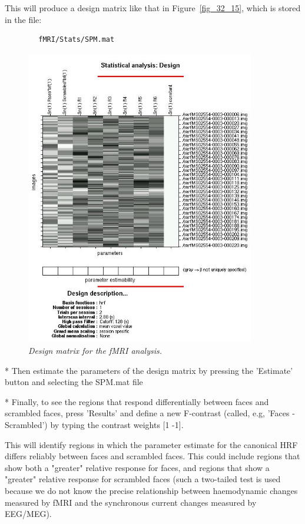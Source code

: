 This will produce a design matrix like that in Figure~\ref{fig_32_15}, which is stored in the file:
\begin{verbatim}
		fMRI/Stats/SPM.mat
\end{verbatim}

\begin{figure}
\begin{center}
\includegraphics[width=100mm]{multimodal/figures/figure_32_21}
\caption{\em Design matrix for the fMRI analysis. \label{fig_32_21}}
\end{center}
\end{figure}

* Then estimate the parameters of the design matrix by pressing the 'Estimate' button and selecting the SPM.mat file

* Finally, to see the regions that respond differentially between faces and scrambled faces, press 'Results' and define a new F-contrast (called, e.g, 'Faces - Scrambled') by typing the contrast weights [1 -1].

This will identify regions in which the parameter estimate for the canonical HRF differs reliably between faces and scrambled faces. This could include regions that show both a "greater" relative response for faces, and regions that show a "greater" relative response for scrambled faces (such a two-tailed test is used because we do not know the precise relationship between haemodynamic changes measured by fMRI and the synchronous current changes measured by EEG/MEG).


